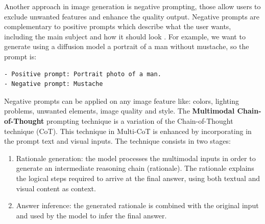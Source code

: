 Another approach in image generation is negative prompting, those allow users to exclude unwanted features and enhance the quality output.
Negative prompts are complementary to  positive prompts which describe what the user wants, including the main subject and how it should look \cite{medium_negative}.
For example, we want to generate using a diffusion model a portrait of a man without mustache, so the prompt is:
\begin{lstlisting}
- Positive prompt: Portrait photo of a man.
- Negative prompt: Mustache
\end{lstlisting}
Negative prompts can be applied on any image feature like: colors, lighting problems, unwanted elements, image quality and style.
The \textbf{Multimodal Chain-of-Thought} prompting technique \cite{zhang2023multimodal} is a variation of the Chain-of-Thought technique (CoT).
This technique in Multi-CoT is enhanced by incorporating in the prompt text and visual inputs.
The technique consists in two stages:
\begin{enumerate}
    \item Rationale generation: the model processes the multimodal inputs in order to generate an intermediate reasoning chain (rationale). The rationale explains the logical steps required to arrive at the final answer, using both textual and visual content as context.

    \item Answer inference: the generated rationale is combined with the original input and used by the model to infer the final answer.
\end{enumerate}
